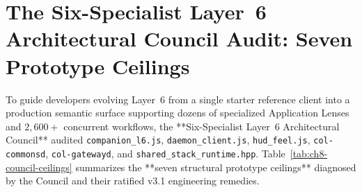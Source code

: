 \section{The Six-Specialist Layer~6 Architectural Council Audit: Seven Prototype Ceilings}
\label{sec:council-audit-l6}

To guide developers evolving Layer~6 from a single starter reference client into a production semantic surface supporting dozens of specialized Application Lenses and $2{,}600+$ concurrent workflows, the **Six-Specialist Layer~6 Architectural Council** audited \texttt{companion\_l6.js}, \texttt{daemon\_client.js}, \texttt{hud\_feel.js}, \texttt{col-commonsd}, \texttt{col-gatewayd}, and \texttt{shared\_stack\_runtime.hpp}. Table~\ref{tab:ch8-council-ceilings} summarizes the **seven structural prototype ceilings** diagnosed by the Council and their ratified v3.1 engineering remedies.

